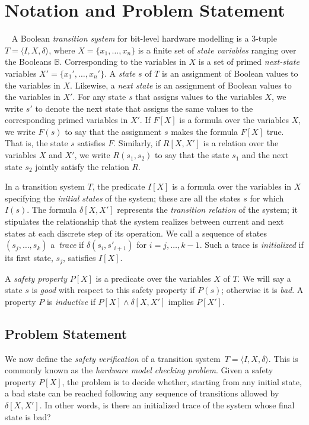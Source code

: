 \section{Notation and Problem Statement}~\label{sec:notation}
%
A Boolean \textit{transition system} for bit-level hardware
modelling is a 3-tuple $T = \langle I,X,\delta \rangle$, where $X = \{x_1,\dots ,x_n\}$
is a finite set of \textit{state variables} ranging over the Booleans $\mathbb{B}$. 
Corresponding to the variables in $X$ is a set of primed \textit{next-state} variables  $X' = \{x_1', \dots, x_n'\}$.
A \textit{state} $s$ of $T$ is an assignment of Boolean values to the variables in $X$. Likewise, a \textit{next state} is an assignment of Boolean values to the variables in $X'$.  For any state $s$ that assigns values to the  variables $X$, we write $s'$ to denote the next state that assigns the same values to the corresponding primed variables in $X'$. If $F[X]$ is a formula over the variables $X$, we write $F(s)$ to say that
the assignment $s$ makes the formula $F[X]$ true. That is, the state $s$ satisfies $F$. Similarly, if $R[X,X']$ is a relation over the variables $X$ and $X'$, we write $R(s_1,s_2)$ to say that the state $s_1$ and the next state $s_2$ jointly satisfy the relation $R$.

In a transition system $T$, the predicate $I[X]$ is a formula over
the variables in $X$ specifying the \textit{initial states} of the system; these are all the states $s$ for which
$I(s)$. The formula $\delta[X,X']$ represents the \textit{transition relation} of the system; it stipulates the relationship that the system
realizes between current and next states at each discrete step of its operation.
We call a sequence of states $(s_j,\dots,s_k)$ a~\textit{trace}
if $\delta(s_i,s'_{i{+}1})$ for $i=j,\dots,k-1$.  Such a trace is
\textit{initialized} if its first state, $s_j$, satisfies $I[X]$.
  
A \textit{safety property} $P[X]$ is a predicate over the variables $X$ of $T$.  We will say a state $s$ is \textit{good} with respect to this safety property if 
$P(s)$; otherwise it is \textit{bad}. A property $P$ is \textit{inductive} if $P[X] \wedge \delta[X,X']$ implies $P[X']$.    

\subsection{Problem Statement} 
%
We now define the \textit{safety verification} of a transition system~$T = \langle I,X,\delta\rangle$.
This is commonly known as the \textit{hardware model checking problem}.  
Given a safety property $P[X]$, the problem is to decide whether, starting from any initial state, a bad state can be reached following any sequence of transitions allowed by $\delta[X,X']$. In other words, is there an initialized trace of the system whose final state is bad?

